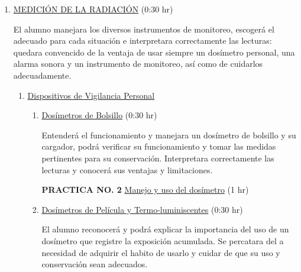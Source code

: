 \documentclass[11pt, oneside]{book}
\begin{document}
\begin{enumerate}
\begin{enumerate}[label*=\arabic*.]
        Podrá señalar la diferencia entre los efectos somáticos y los
        efectos genéticos, así como la diferente radio-sensibilidad de los
        distintos tipos de células, tejidos y órganos.
      \item \ul{Relaci\'on Dosis-Efecto}

        Describirá la diferencia entre dosis aguda y dosis crónica,
        distinguirá los valores de dosis que producen los distintos
        efectos, desde un eritem hasta una dosis letal, así como la
        diferencia entre una irradiación localizada y una irradiación a
        cuerpo entero.
      \item \ul{Formas de Exposici\'on a la Radiaci\'on}

        El alumno distinguirá entre casos de exposición a radiación
        externa, ingestión, inhalación, y dosis interna.
    \end{enumerate}
  \item \ul{MEDICI\'ON DE LA RADIACI\'ON} \hfill (0:30 hr)

    El alumno manejara los diversos instrumentos de monitoreo, escogerá
    el adecuado para cada situación e interpretara correctamente las
    lecturas: quedara convencido de la ventaja de usar siempre un
    dosímetro personal, una alarma sonora y un instrumento de monitoreo,
    así como de cuidarlos adecuadamente.
    \begin{enumerate}[label*=\arabic*.]
      \item \ul{Dispositivos de Vigilancia Personal}
        \begin{enumerate}
          \item \ul{Dos\'imetros de Bolsillo} \hfill (0:30 hr)

            Entenderá el funcionamiento y manejara un dosímetro de bolsillo
            y su cargador, podrá verificar su funcionamiento y tomar las
            medidas pertinentes para su conservación. Interpretara
            correctamente las lecturas y conocerá sus ventajas y
            limitaciones.

            \textbf{PRACTICA NO. 2} \ul{Manejo y uso del dos\'imetro}
            \hfill (1 hr)
          \item \ul{Dos\'imetros de Pel\'icula y Termo-luminiscentes}
            \hfill (0:30 hr)

            El alumno reconocerá y podrá explicar la importancia del uso de
            un dosímetro que registre la exposición acumulada. Se percatara
            del a necesidad de adquirir el habito de usarlo y cuidar de que
            su uso y conservación sean adecuados.


\end{enumerate}
\end{enumerate}
\end{enumerate}
\end{document}
